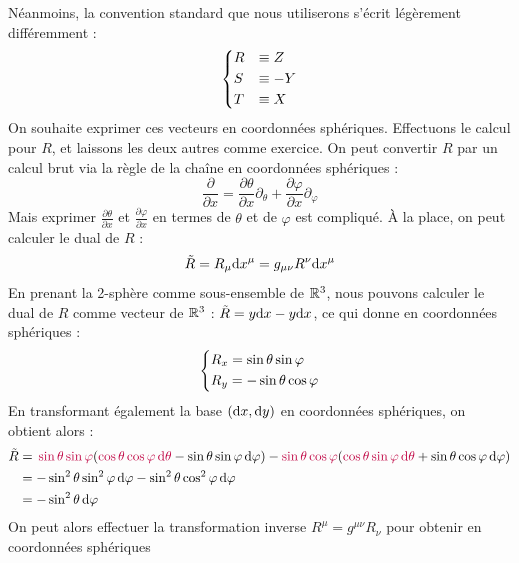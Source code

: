 Néanmoins, la convention standard que nous utiliserons s'écrit légèrement différemment :
\begin{align}
    \begin{dcases}
        R &\equiv Z \\
        S &\equiv - Y \\
        T &\equiv X 
    \end{dcases}
\end{align}
On souhaite exprimer ces vecteurs en coordonnées sphériques. Effectuons le calcul pour $R$, et laissons les deux autres comme exercice. On peut convertir $R$ par un calcul brut via la règle de la chaîne en coordonnées sphériques :
\begin{equation}
    \frac{\partial}{\partial x} = \frac{\partial \theta}{\partial x} \partial_{\theta}+ \frac{\partial \varphi}{\partial x}\partial_{\varphi}
\end{equation}
Mais exprimer $\frac{\partial \theta}{\partial x} $ et $\frac{\partial \varphi}{\partial x}$ en termes de $\theta$ et de $\varphi$ est compliqué. À la place, on peut calculer le dual de $R$ :
\begin{equation}
    \tilde R = R_{\mu}\mathrm{d} x^{\mu} =  g_{\mu \nu}R^{\nu}\mathrm{d} x^{\mu}
\end{equation}
En prenant la 2-sphère comme sous-ensemble de $\mathbb{R}^3$, nous pouvons calculer le dual de $R$ comme vecteur de $\mathbb{R}^3$ : $\tilde R = y \mathrm{d} x - y \mathrm{d} x$, ce qui donne en coordonnées sphériques :
\begin{align}
    \begin{dcases}
        R_x = \sin \theta \sin \varphi\\
        R_y = - \sin \theta \cos \varphi
    \end{dcases}
\end{align}
En transformant également la base $(\mathrm{d} x,\mathrm{d} y)$ en coordonnées sphériques, on obtient alors :
\begin{align*}
    \tilde R &= \,\textcolor{purple}{\sin{\theta}\sin{\varphi}}(\textcolor{purple}{\cos{\theta} \cos{\varphi}\, \mathrm{d} \theta}- \sin{\theta} \sin{\varphi}\, \mathrm{d} \varphi) - \textcolor{purple}{\sin{\theta}\cos{\varphi}}(\textcolor{purple}{\cos{\theta} \sin{\varphi} \, \mathrm{d} \theta} + \sin{\theta} \cos{\varphi} \, \mathrm{d} \varphi)\\ 
    &= - \sin^2{\theta}\sin^2{\varphi}\, \mathrm{d} \varphi - \sin^2{\theta}\cos^2{\varphi}\, \mathrm{d} \varphi\\
    &= - \sin^2{\theta}\, \mathrm{d} \varphi
\end{align*}
On peut alors effectuer la transformation inverse $R^{\mu} = g^{\mu \nu}R_{\nu}$ pour obtenir en coordonnées sphériques

